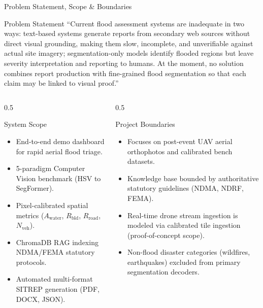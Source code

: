 \documentclass[aspectratio=169, 10pt, professionalfonts]{beamer}
\begin{document}
\begin{frame}{Problem Statement, Scope \& Boundaries}
  \begin{exampleblock}{Problem Statement}
    \small
    ``Current flood assessment systems are inadequate in two ways: text-based systems generate reports from secondary web sources without direct visual grounding, making them slow, incomplete, and unverifiable against actual site imagery; segmentation-only models identify flooded regions but leave severity interpretation and reporting to humans. At the moment, no solution combines report production with fine-grained flood segmentation so that each claim may be linked to visual proof.''
  \end{exampleblock}

  \vspace{0.4em}
  \begin{columns}[T]
    \begin{column}{0.5\textwidth}
      \begin{block}{System Scope}
        \begin{itemize}\footnotesize
          \item End-to-end demo dashboard for rapid aerial flood triage.
          \item 5-paradigm Computer Vision benchmark (HSV to SegFormer).
          \item Pixel-calibrated spatial metrics ($A_{\text{water}}$, $R_{\text{bld}}$, $R_{\text{road}}$, $N_{\text{veh}}$).
          \item ChromaDB RAG indexing NDMA/FEMA statutory protocols.
          \item Automated multi-format SITREP generation (PDF, DOCX, JSON).
        \end{itemize}
      \end{block}
    \end{column}
    
    \begin{column}{0.5\textwidth}
      \begin{block}{Project Boundaries}
        \begin{itemize}\footnotesize
          \item Focuses on post-event UAV aerial orthophotos and calibrated bench datasets.
          \item Knowledge base bounded by authoritative statutory guidelines (NDMA, NDRF, FEMA).
          \item Real-time drone stream ingestion is modeled via calibrated tile ingestion (proof-of-concept scope).
          \item Non-flood disaster categories (wildfires, earthquakes) excluded from primary segmentation decoders.
        \end{itemize}
      \end{block}
    \end{column}
  \end{columns}
\end{frame}
\end{document}
